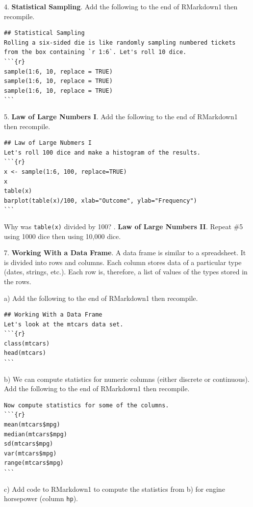 \documentclass[10pt]{article}
\begin{document}
4.  \textbf{Statistical Sampling}.
Add the following to the end of RMarkdown1 then recompile.\vspace{-10pt}
\begin{verbatim}
## Statistical Sampling
Rolling a six-sided die is like randomly sampling numbered tickets
from the box containing `r 1:6`. Let's roll 10 dice.
```{r}
sample(1:6, 10, replace = TRUE)
sample(1:6, 10, replace = TRUE)
sample(1:6, 10, replace = TRUE)
```
\end{verbatim}

5. \textbf{Law of Large Numbers I}.
Add the following to the end of RMarkdown1 then recompile.\vspace{-10pt}
\begin{verbatim}
## Law of Large Nubmers I
Let's roll 100 dice and make a histogram of the results.
```{r}
x <- sample(1:6, 100, replace=TRUE)
x
table(x)
barplot(table(x)/100, xlab="Outcome", ylab="Frequency")
```
\end{verbatim}
Why was \texttt{table(x)} divided by 100?
\vfill
{}. \textbf{Law of Large Numbers II}.
Repeat \#5 using 1000 dice then using 10,000 dice.
\medskip
\medskip

7. \textbf{Working With a Data Frame}.  A data frame is similar to a spreadsheet.
It is divided into rows and columns.  Each column stores data of a particular type
(dates, strings, etc.).  Each row is, therefore, a list of values of the types
stored in the rows.

\hspace{10pt} a)  Add the following to the end of RMarkdown1 then recompile.\vspace{-10pt}
\begin{verbatim}
## Working With a Data Frame
Let's look at the mtcars data set.
```{r}
class(mtcars)
head(mtcars)
```
\end{verbatim}

\hspace{10pt} b) We can compute statistics for numeric
columns (either discrete or continuous).
Add the following to the end of RMarkdown1 then recompile.\vspace{-10pt}
\begin{verbatim}
Now compute statistics for some of the columns.
```{r}
mean(mtcars$mpg)
median(mtcars$mpg)
sd(mtcars$mpg)
var(mtcars$mpg)
range(mtcars$mpg)
```
\end{verbatim}

\hspace{10pt} c) Add code to RMarkdown1 to compute
the statistics from b) for engine horsepower (column \texttt{hp}).
\medskip
\end{document}

